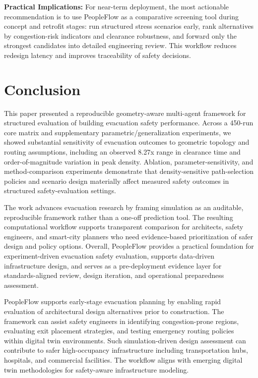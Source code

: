 \documentclass[utf8]{FrontiersinHarvard}
\begin{document}
\noindent\textbf{Practical Implications:} For near-term deployment, the most actionable recommendation is to use PeopleFlow as a comparative screening tool during concept and retrofit stages: run structured stress scenarios early, rank alternatives by congestion-risk indicators and clearance robustness, and forward only the strongest candidates into detailed engineering review. This workflow reduces redesign latency and improves traceability of safety decisions.

\section{Conclusion}
This paper presented a reproducible geometry-aware multi-agent framework for structured evaluation of building evacuation safety performance. Across a 450-run core matrix and supplementary parametric/generalization experiments, we showed substantial sensitivity of evacuation outcomes to geometric topology and routing assumptions, including an observed 8.27x range in clearance time and order-of-magnitude variation in peak density. Ablation, parameter-sensitivity, and method-comparison experiments demonstrate that density-sensitive path-selection policies and scenario design materially affect measured safety outcomes in structured safety-evaluation settings.

The work advances evacuation research by framing simulation as an auditable, reproducible framework rather than a one-off prediction tool. The resulting computational workflow supports transparent comparison for architects, safety engineers, and smart-city planners who need evidence-based prioritization of safer design and policy options. Overall, PeopleFlow provides a practical foundation for experiment-driven evacuation safety evaluation, supports data-driven infrastructure design, and serves as a pre-deployment evidence layer for standards-aligned review, design iteration, and operational preparedness assessment.

PeopleFlow supports early-stage evacuation planning by enabling rapid evaluation of architectural design alternatives prior to construction. The framework can assist safety engineers in identifying congestion-prone regions, evaluating exit placement strategies, and testing emergency routing policies within digital twin environments. Such simulation-driven design assessment can contribute to safer high-occupancy infrastructure including transportation hubs, hospitals, and commercial facilities. The workflow aligns with emerging digital twin methodologies for safety-aware infrastructure modeling.
\end{document}
